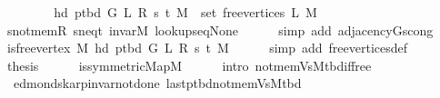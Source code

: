 \begin{isabellebody}
\ \ \ \ \isacommand{{\isachardot}{\kern0pt}}\isamarkupfalse%
\isanewline
\ \ \isamarkupfalse%
\ {\isachardoublequoteopen}hd\ {\isacharparenleft}{\kern0pt}p{\isacharunderscore}{\kern0pt}tbd\ G\ L\ R\ s\ t\ M{\isacharparenright}{\kern0pt}\ {\isasymin}\ set\ {\isacharparenleft}{\kern0pt}free{\isacharunderscore}{\kern0pt}vertices\ L\ M{\isacharparenright}{\kern0pt}{\isachardoublequoteclose}\isanewline
\ \ \ \ \isamarkupfalse%
\ s{\isacharunderscore}{\kern0pt}not{\isacharunderscore}{\kern0pt}mem{\isacharunderscore}{\kern0pt}R\ s{\isacharunderscore}{\kern0pt}neq{\isacharunderscore}{\kern0pt}t\ invar{\isacharunderscore}{\kern0pt}M\ lookup{\isacharunderscore}{\kern0pt}s{\isacharunderscore}{\kern0pt}eq{\isacharunderscore}{\kern0pt}None\isanewline
\ \ \ \ \isamarkupfalse%
\ {\isacharparenleft}{\kern0pt}simp\ add{\isacharcolon}{\kern0pt}\ adjacency{\isacharunderscore}{\kern0pt}G{}{\isacharunderscore}{\kern0pt}s{\isacharunderscore}{\kern0pt}cong{\isacharparenright}{\kern0pt}\isanewline
\ \ \isamarkupfalse%
\ {\isachardoublequoteopen}is{\isacharunderscore}{\kern0pt}free{\isacharunderscore}{\kern0pt}vertex\ M\ {\isacharparenleft}{\kern0pt}hd\ {\isacharparenleft}{\kern0pt}p{\isacharunderscore}{\kern0pt}tbd\ G\ L\ R\ s\ t\ M{\isacharparenright}{\kern0pt}{\isacharparenright}{\kern0pt}{\isachardoublequoteclose}\isanewline
\ \ \ \ \isamarkupfalse%
\ {\isacharparenleft}{\kern0pt}simp\ add{\isacharcolon}{\kern0pt}\ free{\isacharunderscore}{\kern0pt}vertices{\isacharunderscore}{\kern0pt}def{\isacharparenright}{\kern0pt}\isanewline
\ \ \isamarkupfalse%
\ {\isacharquery}{\kern0pt}thesis\isanewline
\ \ \ \ \isamarkupfalse%
\ is{\isacharunderscore}{\kern0pt}symmetric{\isacharunderscore}{\kern0pt}Map{\isacharunderscore}{\kern0pt}M\isanewline
\ \ \ \ \isamarkupfalse%
\ {\isacharparenleft}{\kern0pt}intro\ not{\isacharunderscore}{\kern0pt}mem{\isacharunderscore}{\kern0pt}Vs{\isacharunderscore}{\kern0pt}M{\isacharunderscore}{\kern0pt}tbd{\isacharunderscore}{\kern0pt}if{\isacharunderscore}{\kern0pt}free{\isacharparenright}{\kern0pt}\isanewline
{}\isamarkupfalse%
%
\endisatagproof
{\isafoldproof}%
%
\isadelimproof
\isanewline
%
\endisadelimproof
%
\isadeliminvisible
\isanewline
%
\endisadeliminvisible
%
\isataginvisible
{}\isamarkupfalse%
\ {\isacharparenleft}{\kern0pt}\ edmonds{\isacharunderscore}{\kern0pt}karp{\isacharunderscore}{\kern0pt}invar{\isacharunderscore}{\kern0pt}not{\isacharunderscore}{\kern0pt}done{\isacharunderscore}{\kern0pt}{}{\isacharparenright}{\kern0pt}\ last{\isacharunderscore}{\kern0pt}p{\isacharunderscore}{\kern0pt}tbd{\isacharunderscore}{\kern0pt}not{\isacharunderscore}{\kern0pt}mem{\isacharunderscore}{\kern0pt}Vs{\isacharunderscore}{\kern0pt}M{\isacharunderscore}{\kern0pt}tbd{\isacharcolon}{\kern0pt}\isanewline

\end{isabellebody}
